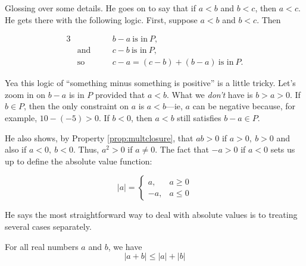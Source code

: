Glossing over some details. He goes on to say that if $a<b$ and $b<c$, then $a<c$. He gets
there with the following logic. First, suppose $a<b$ and $b<c$. Then

\begin{alignat*}{3}
    &\quad&& b-a~\text{is in}~P,\\
    &\text{and}\quad&& c-b~\text{is in}~P,\\
    & \text{so}\quad&& c-a = (c-b) + (b-a)~\text{is in}~P.
\end{alignat*}

Yea this logic of ``something minus something is positive'' is a little tricky. Let's zoom
in on $b-a$ is in $P$ provided that $a<b$. What we \emph{don't} have is $b>a>0$. If $b\in
P$, then the only constraint on $a$ is $a<b$---ie, $a$ can be negative because, for
example, $10 - (-5) > 0$. If $b < 0$, then $a < b$ still satisfies $b-a \in P$. 

He also shows, by Property \ref{prop:multclosure}, that $ab > 0$ if $a>0,~b>0$ and also if
$a<0,~b<0$. Thus, $a^2>0$ if $a \neq 0$.
The fact that $-a >0$ if $a < 0$ sets us up to define the absolute value function:

\begin{definition}
    $$
    \lvert a \rvert = \begin{cases}
        a, & a \geq 0\\
        -a, & a \leq 0
    \end{cases}
    $$
\end{definition}

He says the most straightforward way to deal with absolute values is to treating several
cases separately.

\begin{theorem}
    For all real numbers $a$ and $b$, we have
    $$
    \lvert a + b \rvert \leq \lvert a\rvert + \lvert b \rvert
    $$
\end{theorem}


